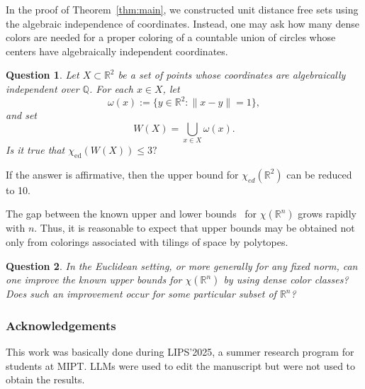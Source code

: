 \documentclass[12pt,a4paper]{article}
\newtheorem{question}{Question}
\begin{document}
In the proof
of Theorem~\ref{thm:main}, we constructed unit distance free sets using the
algebraic independence of coordinates. Instead, one may ask how many
dense colors are needed for a proper coloring of a countable
union of circles whose centers have algebraically independent coordinates.

\begin{question}
Let \(X\subset\mathbb{R}^2\) be a set of points whose coordinates are algebraically independent over $\mathbb{Q}$. For each \(x\in X\), let
\[
\omega(x):=\{y\in\mathbb{R}^2:\|x-y\|=1\},
\]
and set
\[
W(X) =\bigcup_{x\in X}\omega(x).
\]
Is it true that
$
\chi_{\mathrm{ed}}(W(X))\leq 3?
$
\end{question}
 If the answer is affirmative, then the upper bound for $\chi_{ed}(\mathbb{R}^2)$ can be reduced to 10.

The gap between the known upper and lower bounds~\cite{cherkashin2018chromatic} for
\(\chi(\mathbb{R}^n)\) grows rapidly with \(n\). Thus, it is reasonable to expect that upper bounds may be obtained not only
from colorings associated with tilings of space by polytopes.

\begin{question}
In the Euclidean setting, or more generally for any fixed norm, can one improve the known upper bounds for
\(\chi(\mathbb{R}^n)\) by using dense color classes?
Does such an improvement occur for some particular subset of
\(\mathbb{R}^n\)?
\end{question}

\subsubsection*{Acknowledgements}

This work was basically done during LIPS’2025, a summer research program for students at MIPT. LLMs were used to edit the manuscript but were not used to obtain the results.



\end{document}

